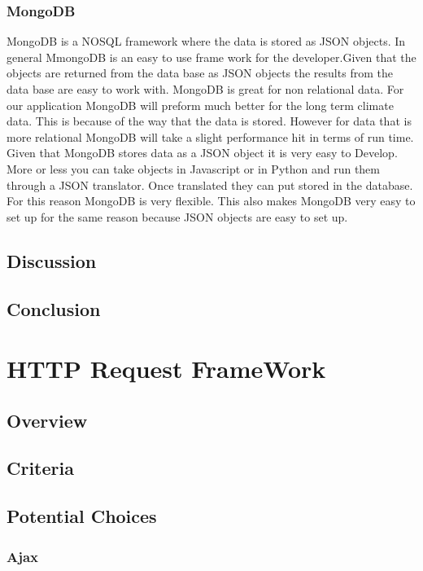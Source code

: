 \documentclass[letterpaper,10pt]{article}
\begin{document}
		\subsubsection{MongoDB}
		MongoDB is a NOSQL framework where the data is stored as JSON objects. In general MmongoDB is an easy to use frame work for the developer.Given that the objects are returned from the data base as JSON objects the results from the data base are easy to work with. MongoDB is great for non relational data. For our application MongoDB will preform much better for the long term climate data. This is because of the way that the data is stored. However for data that is more relational MongoDB will take a slight performance hit in terms of run time. Given that MongoDB stores data as a JSON object it is very easy to Develop. More or less you can take objects in Javascript or in Python and run them through a JSON translator. Once translated they can put stored in the database. For this reason MongoDB is very flexible. This also makes MongoDB very easy to set up for the same reason because JSON objects are easy to set up.
	\subsection{Discussion}
	
	\subsection{Conclusion}
	
	
\section{HTTP Request FrameWork}
		\subsection{Overview}
	
	\subsection{Criteria}
	
	\subsection{Potential Choices}
		\subsubsection{Ajax}
		
\end{document}
